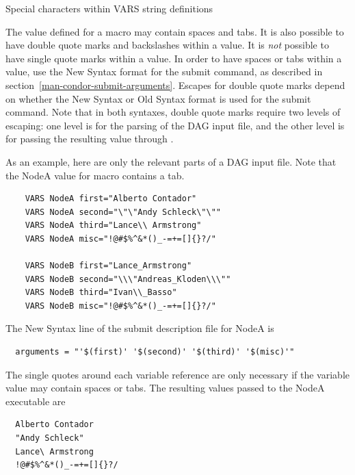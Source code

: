 \begin{description}
\item[Special characters within VARS string definitions]
\end{description}

The value defined for a macro may contain spaces and tabs.
It is also possible to have double quote marks and
backslashes within a value.
It is \emph{not} possible to have single quote marks within a value.
In order to have spaces or tabs within a value,
use the New Syntax format for the  submit command,
as described in section~\ref{man-condor-submit-arguments}.
Escapes for double quote marks
depend on whether the New Syntax or Old Syntax format is used
for the  submit command.
Note that in both syntaxes,
double quote marks require two levels of escaping:
one level is for the parsing of the DAG input file, and the other level is for
passing the resulting value through .

As an example, here are only the relevant parts of a DAG input file.
Note that the NodeA value for macro  contains a tab.
\footnotesize
\begin{verbatim}
    VARS NodeA first="Alberto Contador"
    VARS NodeA second="\"\"Andy	Schleck\"\""
    VARS NodeA third="Lance\\ Armstrong"
    VARS NodeA misc="!@#$%^&*()_-=+=[]{}?/"
    
    VARS NodeB first="Lance_Armstrong"
    VARS NodeB second="\\\"Andreas_Kloden\\\""
    VARS NodeB third="Ivan\\_Basso"
    VARS NodeB misc="!@#$%^&*()_-=+=[]{}?/"
\end{verbatim}
\normalsize

The New Syntax  line of the submit description file
for NodeA is
\footnotesize
\begin{verbatim}
  arguments = "'$(first)' '$(second)' '$(third)' '$(misc)'"
\end{verbatim}
\normalsize
The single quotes around each variable reference are only necessary
if the variable value may contain spaces or tabs.
The resulting values passed to the NodeA executable are
\footnotesize
\begin{verbatim}
  Alberto Contador
  "Andy	Schleck"
  Lance\ Armstrong
  !@#$%^&*()_-=+=[]{}?/
\end{verbatim}
\normalsize


